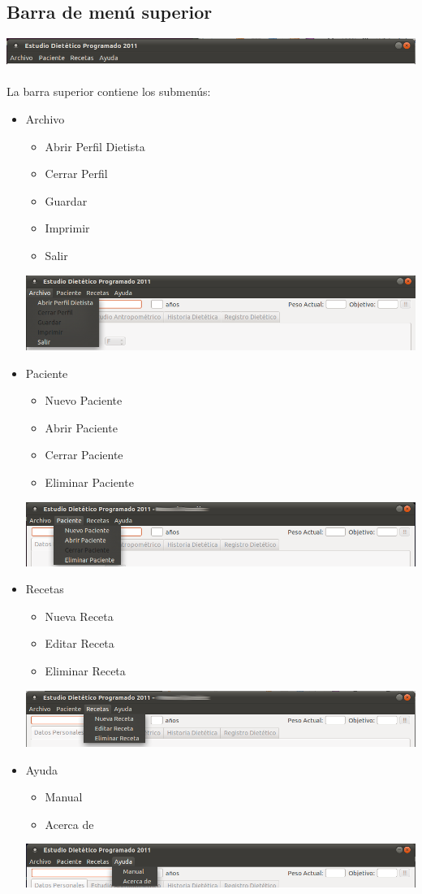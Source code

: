 \documentclass[12pt, spanish]{article}
\begin{document}
\subsection{Barra de menú superior}
\includegraphics[scale=0.5]{Image/barra-superior.png}\\\\
La barra superior contiene los submenús:
\begin{itemize}
\item Archivo
\begin{itemize}
\item Abrir Perfil Dietista
\item Cerrar Perfil
\item Guardar
\item Imprimir
\item Salir
\end{itemize}
\includegraphics[scale=0.5]{Image/archivo-barra.png} 
\item Paciente
\begin{itemize}
\item Nuevo Paciente
\item Abrir Paciente
\item Cerrar Paciente
\item Eliminar Paciente
\end{itemize}
\includegraphics[scale=0.5]{Image/paciente-barra.png} 
\item Recetas
\begin{itemize}
\item Nueva Receta
\item Editar Receta
\item Eliminar Receta
\end{itemize}
\includegraphics[scale=0.5]{Image/receta-barra.png} 
\item Ayuda
\begin{itemize}
\item Manual
\item Acerca de
\end{itemize}
\includegraphics[scale=0.5]{Image/ayuda-barra.png} 
\end{itemize}
\end{document}
